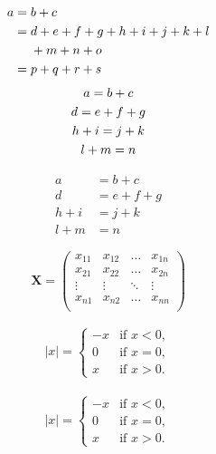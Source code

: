 \documentclass{article}
\begin{document}
	\begin{align}
	a ={} & b + c \\
	={} & d + e + f + g + h + i
	+ j + k + l \notag \\
	& + m + n + o \\
	={} & p + q + r + s
	\end{align}
	\begin{gather}
	a = b + c \\
	d = e + f + g \\
	h + i = j + k \notag \\
	l + m = n
	\end{gather}


	\begin{equation}
	\begin{aligned}
	a &= b + c \\
	d &= e + f + g \\
	h + i &= j + k \\
	l + m &= n
	\end{aligned}
	\end{equation}


	\[ \mathbf{X} = \left(
	\begin{array}{cccc}
	x_{11} & x_{12} & \ldots & x_{1n}\\
	x_{21} & x_{22} & \ldots & x_{2n}\\
	\vdots & \vdots & \ddots & \vdots\\
	x_{n1} & x_{n2} & \ldots & x_{nn}\\
	\end{array} \right) \]

	\begin{equation}
	\begin{aligned}
	|x| = \left\{
		\begin{array}{rl}
		-x & \text{if } x < 0,\\
		0 & \text{if } x = 0,\\
		x & \text{if } x > 0.
		\end{array} \right.
	\end{aligned}
	\end{equation}

		\begin{equation}
		\begin{aligned}
|x| =
\begin{cases}
-x & \text{if } x < 0,\\
0 & \text{if } x = 0,\\
x & \text{if } x > 0.
\end{cases}
		\end{aligned}
		\end{equation}
\end{document}

